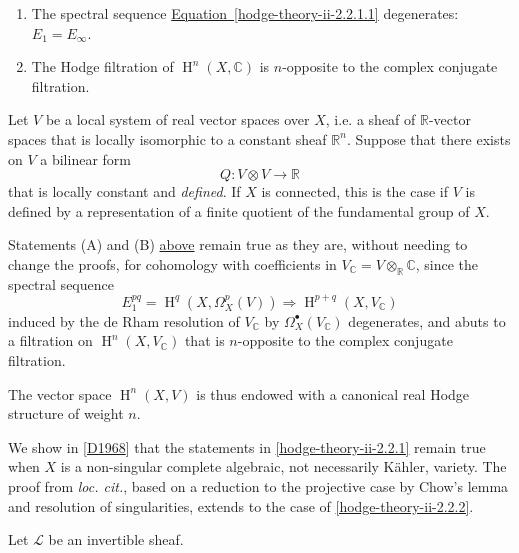     
 \begin{enumerate}
      
 \item[(A)]
        The spectral sequence \hyperref[hodge-theory-ii-2.2.1.1]{Equation~\ref*{hodge-theory-ii-2.2.1.1}} degenerates: \(E_1=E_\infty \).
      

      
 \item[(B)]
        The Hodge filtration of \(\operatorname {H}^n(X,\mathbb {C})\) is \(n\)-opposite to the complex conjugate filtration.
      

    \end{enumerate}\label{hodge-theory-ii-2.2.2}\par{}Let \(V\) be a local system of real vector spaces over \(X\), i.e. a sheaf of \(\mathbb {R}\)-vector spaces that is locally isomorphic to a constant sheaf \(\mathbb {R}^n\).
    Suppose that there exists on \(V\) a bilinear form
    \[       Q\colon  V\otimes  V\to \mathbb {R}     \]
    that is locally constant and \emph{defined}.
    If \(X\) is connected, this is the case if \(V\) is defined by a representation of a finite quotient of the fundamental group of \(X\).\par{}Statements (A) and (B) \hyperref[hodge-theory-ii-2.2.1]{above} remain true as they are, without needing to change the proofs, for cohomology with coefficients in \(V_\mathbb {C}=V\otimes _\mathbb {R}\mathbb {C}\), since the spectral sequence
    \[       E_1^{pq}       = \operatorname {H}^q(X,\Omega _X^p(V))       \Rightarrow  \operatorname {H}^{p+q}(X,V_\mathbb {C})     \]
    induced by the de Rham resolution of \(V_\mathbb {C}\) by \(\Omega _X^\bullet (V_\mathbb {C})\) degenerates, and abuts to a filtration on \(\operatorname {H}^n(X,V_\mathbb {C})\) that is \(n\)-opposite to the complex conjugate filtration.\par{}The vector space \(\operatorname {H}^n(X,V)\) is thus endowed with a canonical real Hodge structure of weight \(n\).\label{hodge-theory-ii-2.2.3}\par{}We show in [\hyperref[D1968]{D1968}] that the statements in \cref{hodge-theory-ii-2.2.1} remain true when \(X\) is a non-singular complete algebraic, not necessarily Kähler, variety.
    The proof from \emph{loc. cit.}, based on a reduction to the projective case by Chow's lemma and resolution of singularities, extends to the case of \cref{hodge-theory-ii-2.2.2}.\label{hodge-theory-ii-2.2.4}\par{}Let \(\mathcal {L}\) be an invertible sheaf.
